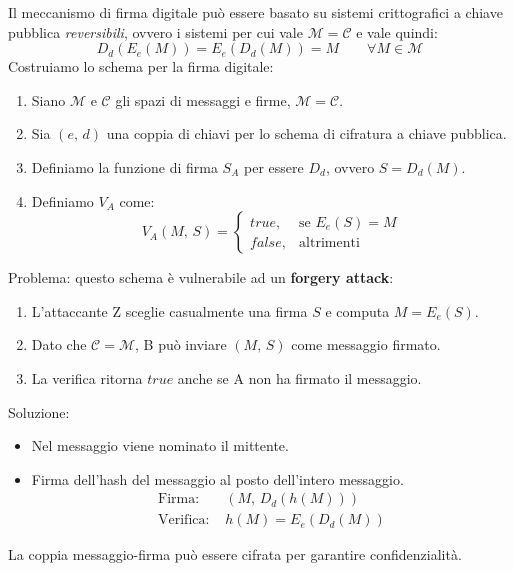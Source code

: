 \documentclass[a4paper, 11pt, notitlepage, fleqn]{report}
\begin{document}
\noindent Il meccanismo di firma digitale può essere basato su sistemi crittografici a chiave pubblica \emph{reversibili}, ovvero i sistemi per cui vale $\mathcal{M} = \mathcal{C}$ e vale quindi:
\begin{equation*}
	D_d(E_e(M)) = E_e(D_d(M)) = M\qquad \forall M\in\mathcal{M}
\end{equation*}
Costruiamo lo schema per la firma digitale:
\begin{enumerate}
	\item Siano $\mathcal{M}$ e $\mathcal{C}$ gli spazi di messaggi e firme, $\mathcal{M} = \mathcal{C}$.
	\item Sia $(e,\,d)$ una coppia di chiavi per lo schema di cifratura a chiave pubblica.
	\item Definiamo la funzione di firma $S_A$ per essere $D_d$, ovvero $S=D_d(M)$.
	\item Definiamo $V_A$ come:
	\begin{equation*}
		V_A(M,\,S) =
		\begin{cases}
		true,& \mbox{se }E_e(S) = M\\
		false,& \mbox{altrimenti}
		\end{cases}
	\end{equation*}
\end{enumerate}
Problema: questo schema è vulnerabile ad un \textbf{forgery attack}:
\begin{enumerate}
	\item L'attaccante Z sceglie casualmente una firma $S$ e computa $M=E_e(S)$.
	\item Dato che $\mathcal{C} = \mathcal{M}$, B può inviare $(M,\,S)$ come messaggio firmato.
	\item La verifica ritorna $true$ anche se A non ha firmato il messaggio.
\end{enumerate}
Soluzione:
\begin{itemize}
	\item Nel messaggio viene nominato il mittente.
	\item Firma dell'hash del messaggio al posto dell'intero messaggio.
	\begin{align*}
		\mbox{Firma: } &(M,\,D_d(h(M)))\\
		\mbox{Verifica: } &h(M) = E_e(D_d(M))
	\end{align*}
\end{itemize}
La coppia messaggio-firma può essere cifrata per garantire confidenzialità.
\end{document}
